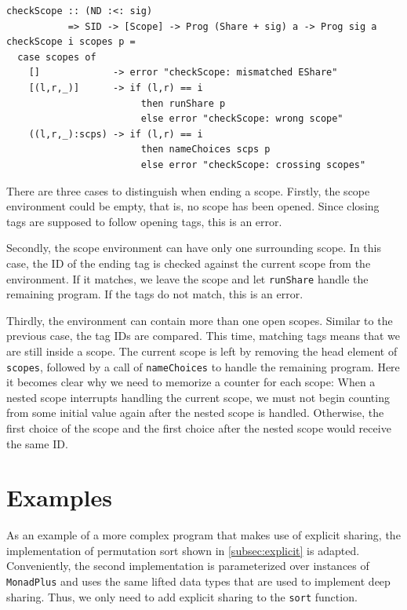 \documentclass[a4paper, 11pt, fleqn, twoside]{scrreprt}
\newcommand{\hinl}[1]{\texttt{#1}}
\begin{document}
\begin{verbatim}
checkScope :: (ND :<: sig)
           => SID -> [Scope] -> Prog (Share + sig) a -> Prog sig a
checkScope i scopes p =
  case scopes of
    []             -> error "checkScope: mismatched EShare"
    [(l,r,_)]      -> if (l,r) == i
                        then runShare p
                        else error "checkScope: wrong scope"
    ((l,r,_):scps) -> if (l,r) == i
                        then nameChoices scps p
                        else error "checkScope: crossing scopes"
\end{verbatim}

There are three cases to distinguish when ending a scope.
Firstly, the scope environment could be empty, that is, no scope has been opened.
Since closing tags are supposed to follow opening tags, this is an error.

Secondly, the scope environment can have only one surrounding scope.
In this case, the ID of the ending tag is checked against the current scope from the environment.
If it matches, we leave the scope and let \hinl{runShare} handle the remaining program.
If the tags do not match, this is an error.

Thirdly, the environment can contain more than one open scopes.
Similar to the previous case, the tag IDs are compared.
This time, matching tags means that we are still inside a scope.
The current scope is left by removing the head element of \hinl{scopes}, followed by a call of \hinl{nameChoices} to handle the remaining program.
Here it becomes clear why we need to memorize a counter for each scope: When a nested scope interrupts handling the current scope, we must not begin counting from some initial value again after the nested scope is handled.
Otherwise, the first choice of the scope and the first choice after the nested scope would receive the same ID.

\section{Examples}

As an example of a more complex program that makes use of explicit sharing, the implementation of permutation sort shown in \autoref{subsec:explicit} is adapted.
Conveniently, the second implementation is parameterized over instances of \hinl{MonadPlus} and uses the same lifted data types that are used to implement deep sharing.
Thus, we only need to add explicit sharing to the \hinl{sort} function.
\end{document}
